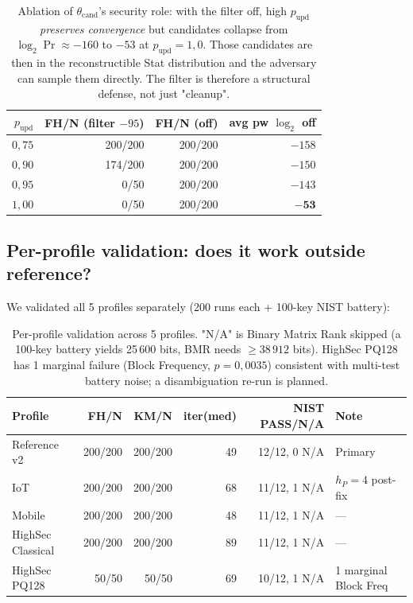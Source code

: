 \documentclass[11pt,a4paper]{article}
\begin{document}
\begin{table}[ht]
\centering
\small
\begin{tabular}{rrrr}
\toprule
$p_\text{upd}$ & FH/N (filter $-95$) & FH/N (off) & avg pw $\log_2$ off \\
\midrule
$0{,}75$ & 200/200 & 200/200 & $-158$ \\
$0{,}90$ & 174/200 & 200/200 & $-150$ \\
$0{,}95$ & 0/50 & 200/200 & $-143$ \\
$1{,}00$ & 0/50 & 200/200 & $\boldsymbol{-53}$ \\
\bottomrule
\end{tabular}
\caption{Ablation of $\theta_\text{cand}$'s security role: with the filter off, high $p_\text{upd}$ \emph{preserves convergence} but candidates collapse from $\log_2 \Pr \approx -160$ to $-53$ at $p_\text{upd}=1{,}0$. Those candidates are then in the reconstructible Stat distribution and the adversary can sample them directly. The filter is therefore a structural defense, not just "cleanup".}
\label{tab:pop-cand-ablation}
\end{table}

\subsection{Per-profile validation: does it work outside reference?}\label{pop:exp-profiles}

We validated all 5 profiles separately (200 runs each + 100-key NIST battery):

\begin{table}[ht]
\centering
\small
\begin{tabular}{lrrrrl}
\toprule
Profile & FH/N & KM/N & iter(med) & NIST PASS/N/A & Note \\
\midrule
Reference v2 & 200/200 & 200/200 & 49 & 12/12, 0 N/A & Primary \\
IoT & 200/200 & 200/200 & 68 & 11/12, 1 N/A & $h_P=4$ post-fix \\
Mobile & 200/200 & 200/200 & 48 & 11/12, 1 N/A & --- \\
HighSec Classical & 200/200 & 200/200 & 89 & 11/12, 1 N/A & --- \\
HighSec PQ128 & 50/50 & 50/50 & 69 & 10/12, 1 N/A & 1 marginal Block Freq \\
\bottomrule
\end{tabular}
\caption{Per-profile validation across 5 profiles. "N/A" is Binary Matrix Rank skipped (a 100-key battery yields 25\,600 bits, BMR needs $\geq 38\,912$ bits). HighSec PQ128 has 1 marginal failure (Block Frequency, $p=0{,}0035$) consistent with multi-test battery noise; a disambiguation re-run is planned.}
\label{tab:pop-profiles-validation}
\end{table}
\end{document}
